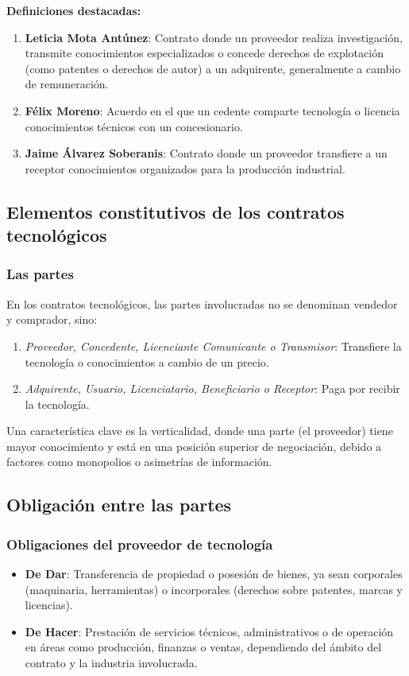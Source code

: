 \documentclass{templateNote}
\begin{document}
\noindent\textbf{Definiciones destacadas:}
\begin{enumerate}
    \item \textbf{Leticia Mota Antúnez}: Contrato donde un proveedor realiza investigación, transmite conocimientos especializados o concede derechos de explotación (como patentes o derechos de autor) a un adquirente, generalmente a cambio de remuneración.
    \item \textbf{Félix Moreno}: Acuerdo en el que un cedente comparte tecnología o licencia conocimientos técnicos con un concesionario.
    \item \textbf{Jaime Álvarez Soberanis}: Contrato donde un proveedor transfiere a un receptor conocimientos organizados para la producción industrial.
\end{enumerate}

\subsection{Elementos constitutivos de los contratos tecnológicos}
\subsubsection{Las partes}

En los contratos tecnológicos, las partes involucradas no se denominan vendedor y comprador, sino:

\begin{enumerate}
    \item \textit{Proveedor, Concedente, Licenciante Comunicante o Transmisor}: Transfiere la tecnología o conocimientos a cambio de un precio.
    \item \textit{Adquirente, Usuario, Licenciatario, Beneficiario o Receptor}: Paga por recibir la tecnología.
\end{enumerate}

Una característica clave es la verticalidad, donde una parte (el proveedor) tiene mayor conocimiento y está en una posición superior de negociación, debido a factores como monopolios o asimetrías de información.

\subsection*{Obligación entre las partes}
\subsubsection*{Obligaciones del proveedor de tecnología}
\begin{itemize}
    \item \textbf{De Dar}: Transferencia de propiedad o posesión de bienes, ya sean corporales (maquinaria, herramientas) o incorporales (derechos sobre patentes, marcas y licencias).
    \item \textbf{De Hacer}: Prestación de servicios técnicos, administrativos o de operación en áreas como producción, finanzas o ventas, dependiendo del ámbito del contrato y la industria involucrada.
\end{itemize}
\end{document}
